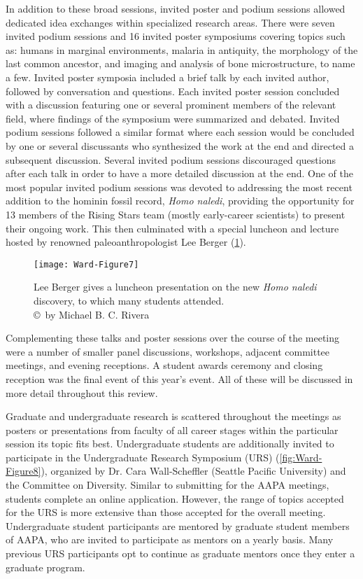 \documentclass[english]{ijsra}
\def\authortwo{Michael B. C. Rivera}
\begin{document}
In addition to these broad sessions, 
invited poster and podium sessions allowed dedicated idea exchanges within specialized research areas. 
There were seven invited podium sessions and 16 invited poster symposiums covering topics such as: humans in marginal environments, 
malaria in antiquity, the morphology of the last common ancestor, and imaging and analysis of bone microstructure, to name a few. 
Invited poster symposia included a brief talk by each invited author, followed by conversation and questions. 
Each invited poster session concluded with a discussion featuring one or several prominent members of the relevant field,
where findings of the symposium were summarized and debated. 
Invited podium sessions followed a similar format where each session would be concluded by one or several discussants who synthesized
the work at the end and directed a subsequent discussion. 
Several invited podium sessions discouraged questions after each talk in order to have a more detailed discussion at the end.
One of the most popular invited podium sessions was devoted to addressing the most recent addition to the hominin fossil record,
\emph{Homo naledi}, providing the opportunity for 13 members of the Rising Stars team (mostly early-career scientists)
to present their ongoing work. 
This then culminated with a special luncheon and lecture hosted by renowned paleoanthropologist Lee Berger (\cref{fig:Ward-Figure7}).

	\begin{figure}[!htb] %
		\centering
		\texttt{[image: Ward-Figure7]}
		\caption{Lee Berger gives a luncheon presentation on the new \emph{Homo naledi} discovery, to which many students attended.
		{\normalfont\scriptsize \\ \copyright\ by \authortwo}}
		\label{fig:Ward-Figure7}
	\end{figure}

Complementing these talks and poster sessions over the course of the meeting were a number of smaller panel discussions,
workshops, adjacent committee meetings, and evening receptions. 
A student awards ceremony and closing reception was the final event of this year’s event.  
All of these will be discussed in more detail throughout this review.

Graduate  and undergraduate research is scattered throughout the meetings as posters or presentations
from faculty of all career stages within the particular session its topic fits best. Undergraduate students are additionally invited
to participate in the Undergraduate Research Symposium (URS) (\cref{fig:Ward-Figure8}), organized by Dr. Cara Wall-Scheffler
(Seattle Pacific University) and the Committee on Diversity.  
Similar to submitting for the AAPA meetings, students complete an online application.
However, the range of topics accepted for the URS is more extensive than those accepted for the overall meeting.
Undergraduate student participants are mentored by graduate student members of AAPA,
who are invited to participate as mentors on a yearly basis.
Many previous URS participants opt to continue as graduate mentors once they enter a graduate program.
\end{document}
